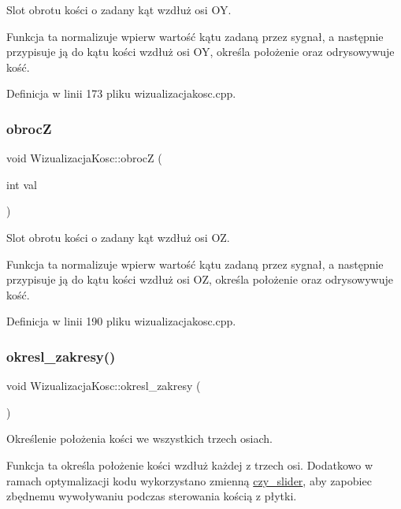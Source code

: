 Slot obrotu kości o zadany kąt wzdłuż osi OY. 

Funkcja ta normalizuje wpierw wartość kątu zadaną przez sygnał, a następnie przypisuje ją do kątu kości wzdłuż osi OY, określa położenie oraz odrysowywuje kość. 

Definicja w linii 173 pliku wizualizacjakosc.\+cpp.

\mbox{\label{class_wizualizacja_kosc_a3da3fdf570d1b5257992ee76b612792d}} 
\subsubsection{\texorpdfstring{obrocZ}{obrocZ}}
{\footnotesize\ttfamily void Wizualizacja\+Kosc\+::obrocZ (\begin{DoxyParamCaption}\item[{int}]{val }\end{DoxyParamCaption})\hspace{0.3cm}{\ttfamily [slot]}}



Slot obrotu kości o zadany kąt wzdłuż osi OZ. 

Funkcja ta normalizuje wpierw wartość kątu zadaną przez sygnał, a następnie przypisuje ją do kątu kości wzdłuż osi OZ, określa położenie oraz odrysowywuje kość. 

Definicja w linii 190 pliku wizualizacjakosc.\+cpp.

\mbox{\label{class_wizualizacja_kosc_af65c8f14882161876dad59a3d0e754c2}} 
\subsubsection{\texorpdfstring{okresl\+\_\+zakresy()}{okresl\_zakresy()}}
{\footnotesize\ttfamily void Wizualizacja\+Kosc\+::okresl\+\_\+zakresy (\begin{DoxyParamCaption}{ }\end{DoxyParamCaption})}



Określenie położenia kości we wszystkich trzech osiach. 

Funkcja ta określa położenie kości wzdłuż każdej z trzech osi. Dodatkowo w ramach optymalizacji kodu wykorzystano zmienną \hyperlink{class_wizualizacja_kosc_a25d14786810ffb0496b4cd8492fcb03f}{czy\+\_\+slider}, aby zapobiec zbędnemu wywoływaniu podczas sterowania kością z płytki.

